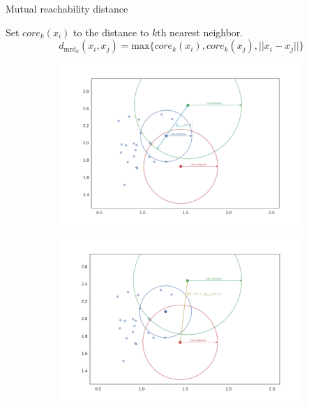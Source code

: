 \documentclass{beamer}
\begin{document}
\begin{frame}{Mutual reachability distance}

\begin{definition}
	Set $core_k(x_i)$ to the distance to $k$th nearest neighbor.
	$$d_{\mathrm{mrd}_k}(x_i, x_j) = \text{max}\{core_k(x_i), core_k(x_j), ||x_i - x_j||\}$$
\end{definition}

\begin{figure}[h!]
	\begin{subfigure}{.5\textwidth}
		\centering
		\includegraphics[width=\linewidth]{dis_figure1.png}
		\caption{}
	\end{subfigure}%
	\begin{subfigure}{.5\textwidth}
		\centering
		\includegraphics[width=\linewidth]{dis_figure2.png}
		\caption{}
	\end{subfigure}
\end{figure}

\end{frame}
\end{document}
